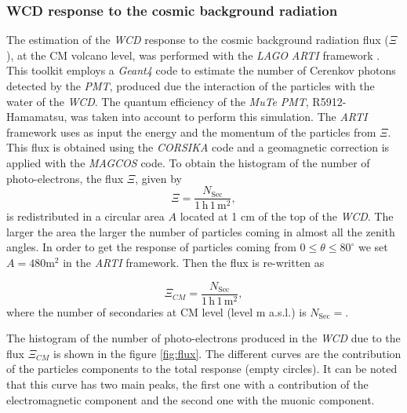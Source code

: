 \documentclass[submitting]{nst}
\begin{document}
\subsubsection{WCD response to the cosmic background radiation}%
The estimation of the \textsl{WCD} response to the cosmic background radiation flux ($\Xi$), at the CM volcano level, was performed with the \textsl{LAGO} \textsl{ARTI} framework \cite{SarmientoEtal2019}. This toolkit employs a \textsl{Geant4} code to estimate the number of Cerenkov photons detected by the \textsl{PMT}, produced due the interaction of the particles with the water of the \textsl{WCD}. The quantum efficiency of the \textsl{MuTe} \textsl{PMT}, R5912-Hamamatsu, was taken into account to perform this simulation. The \textsl{ARTI} framework uses as input the energy and the momentum of the particles from $\Xi$. This flux is obtained using the \textsl{CORSIKA} code and a geomagnetic correction is applied with the \textsl{MAGCOS} code. To obtain the histogram of the number of photo-electrons, the flux $\Xi$, given by
\begin{equation}
\Xi = \frac{N_{\mathrm{Sec}}}{1\,\mathrm{h}\, 1\,\mathrm{m}^2}, 
\end{equation}
is redistributed in a circular area $A$ located at 1 cm of the top of the \textsl{WCD}. The larger the area the larger the number of particles coming in almost all the zenith angles. In order to get the response of particles coming from $0\leq \theta \leq 80^{\circ}$ we set $A=480$m$^2$ in the \textsl{ARTI} framework. Then the flux is re-written as

\begin{equation}
\Xi_{CM} = \frac{N_{\mathrm{Sec}}}{1\,\mathrm{h}\, 1\,\mathrm{m}^2}, 
\end{equation}
where the number of secondaries at CM level (level m a.s.l.) is $N_{\mathrm{Sec}}=$.

The histogram of the number of photo-electrons produced in the \textsl{WCD} due to the flux $\Xi_{CM}$ is shown in the figure \ref{fig:flux}. The different curves are the contribution of the particles components to the total response (empty circles). It can be noted that this curve has two main peaks, the first one with a contribution of the electromagnetic component and the second one with the muonic component.
\end{document}
